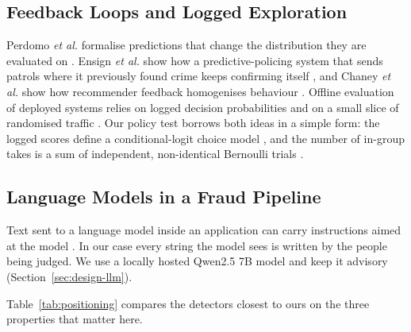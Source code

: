\documentclass[journal]{IEEEtran}
\begin{document}
\subsection{Feedback Loops and Logged Exploration}
Perdomo \emph{et al.} formalise predictions that change the distribution they are
evaluated on \cite{perdomo2020performative}. Ensign \emph{et al.} show how a
predictive-policing system that sends patrols where it previously found crime keeps
confirming itself \cite{ensign2018runaway}, and Chaney \emph{et al.} show how
recommender feedback homogenises behaviour \cite{chaney2018algorithmic}. Offline
evaluation of deployed systems relies on logged decision probabilities
\cite{bottou2013counterfactual} and on a small slice of randomised traffic
\cite{li2010contextual}. Our policy test borrows both ideas in a simple form: the
logged scores define a conditional-logit choice model \cite{mcfadden1974conditional},
and the number of in-group takes is a sum of independent, non-identical Bernoulli
trials \cite{wang1993number}.

\subsection{Language Models in a Fraud Pipeline}
Text sent to a language model inside an application can carry instructions aimed at
the model \cite{greshake2023not}. In our case every string the model sees is written
by the people being judged. We use a locally hosted Qwen2.5 7B model
\cite{qwen2024qwen25} and keep it advisory (Section~\ref{sec:design-llm}).

Table~\ref{tab:positioning} compares the detectors closest to ours on the three
properties that matter here.
\end{document}
